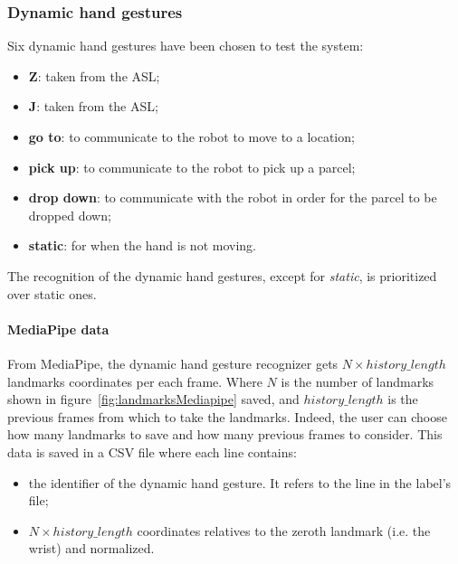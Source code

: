\documentclass[../thesis.tex]{subfiles}
\begin{document}
\subsubsection{Dynamic hand gestures}
Six dynamic hand gestures have been chosen to test the system:
\begin{itemize}
    \item \textbf{Z}: taken from the \acrshort{ASL};
    \item \textbf{J}: taken from the \acrshort{ASL};
    \item \textbf{go to}: to communicate to the robot to move to a location;
    \item \textbf{pick up}: to communicate to the robot to pick up a parcel;
    \item \textbf{drop down}: to communicate with the robot in order for the parcel to be dropped down;
    \item \textbf{static}: for when the hand is not moving.
\end{itemize}
The recognition of the dynamic hand gestures, except for \textit{static}, is prioritized over static ones.
\paragraph{MediaPipe data}
From MediaPipe, the dynamic hand gesture recognizer gets $N \times history\_length$ landmarks coordinates per each frame. Where $N$ is the number of landmarks shown in figure~\ref{fig:landmarksMediapipe} saved, and $history\_length$ is the previous frames from which to take the landmarks. Indeed, the user can choose how many landmarks to save and how many previous frames to consider. This data is saved in a CSV file where each line contains: 
\begin{itemize}
    \item the identifier of the dynamic hand gesture. It refers to the line in the label’s file; 
    \item $N \times history\_length$ coordinates relatives to the zeroth landmark (i.e. the wrist) and normalized.
\end{itemize}
\end{document}

